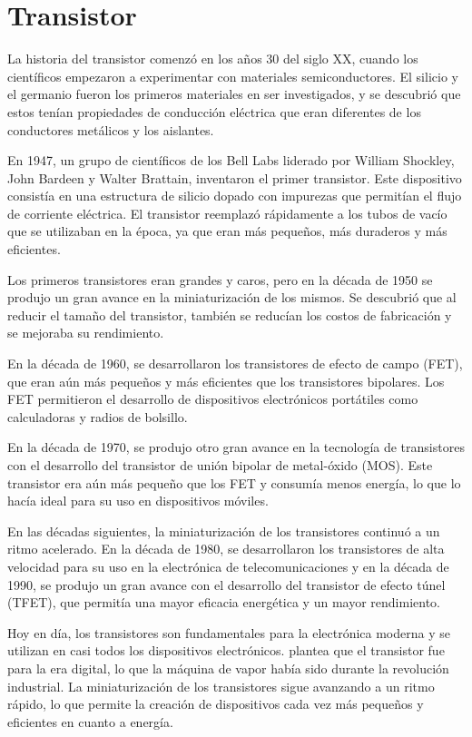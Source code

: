 \documentclass{article}
\begin{document}
\newpage

\section*{Transistor}

La historia del transistor comenzó en los años 30 del siglo XX, cuando los científicos empezaron a experimentar
con materiales semiconductores. El silicio y el germanio fueron los primeros materiales en ser investigados, 
y se descubrió que estos tenían propiedades de conducción eléctrica que eran diferentes de los conductores metálicos
y los aislantes.

En 1947, un grupo de científicos de los Bell Labs liderado por William Shockley, John Bardeen y Walter Brattain, 
inventaron el primer transistor. Este dispositivo consistía en una estructura de silicio dopado con impurezas que 
permitían el flujo de corriente eléctrica. El transistor reemplazó rápidamente a los tubos de vacío 
que se utilizaban en la época, ya que eran más pequeños, más duraderos y más eficientes.

Los primeros transistores eran grandes y caros, pero en la década de 1950 se produjo un gran avance en la miniaturización
de los mismos. Se descubrió que al reducir el tamaño del transistor, también se reducían los costos de fabricación y se 
mejoraba su rendimiento.

En la década de 1960, se desarrollaron los transistores de efecto de campo (FET), que eran aún más 
pequeños y más eficientes que los transistores bipolares. Los FET permitieron el desarrollo de dispositivos 
electrónicos portátiles como calculadoras y radios de bolsillo. 

En la década de 1970, se produjo otro gran avance en la tecnología de transistores con el desarrollo del 
transistor de unión bipolar de metal-óxido (MOS). Este transistor era aún más pequeño que los FET y consumía 
menos energía, lo que lo hacía ideal para su uso en dispositivos móviles.\cite{park2009history}

En las décadas siguientes, la miniaturización de los transistores continuó a un ritmo acelerado. En la década de 1980, 
se desarrollaron los transistores de alta velocidad para su uso en la electrónica de telecomunicaciones y en la década
de 1990, se produjo un gran avance con el desarrollo del transistor de efecto túnel (TFET), que permitía una mayor 
eficacia energética y un mayor rendimiento.

Hoy en día, los transistores son fundamentales para la electrónica moderna y se utilizan en casi todos los 
dispositivos electrónicos. \cite{isaacson2019innovadores} plantea que el transistor fue para la era digital, 
lo que la máquina de vapor había sido durante la revolución industrial. La miniaturización de los transistores
sigue avanzando a un ritmo rápido, lo que permite la creación de dispositivos cada vez más pequeños 
y eficientes en cuanto a energía.
\end{document}
